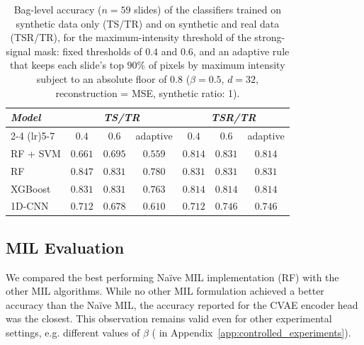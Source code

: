 \documentclass[12pt]{article}
\theoremstyle{paper}
\begin{document}
\begin{table}[H]
\centering
\small
\begin{tabular*}{\textwidth}{@{\extracolsep{\fill}}lcccccc}
\toprule
\multirow{2}{*}{\emph{Model}} & \multicolumn{3}{c}{\emph{TS/TR}} & \multicolumn{3}{c}{\emph{TSR/TR}} \\
\cmidrule(lr){2-4} \cmidrule(lr){5-7}
 & $0.4$ & $0.6$ & adaptive & $0.4$ & $0.6$ & adaptive \\
\midrule
RF + SVM & $0.661$ & $0.695$ & $0.559$ & $0.814$ & $0.831$ & $0.814$ \\
RF & $0.847$ & $0.831$ & $0.780$ & $0.831$ & $0.831$ & $0.831$ \\
XGBoost & $0.831$ & $0.831$ & $0.763$ & $0.814$ & $0.814$ & $0.814$ \\
1D-CNN & $0.712$ & $0.678$ & $0.610$ & $0.712$ & $0.746$ & $0.746$ \\
\bottomrule
\end{tabular*}
\caption{\small Bag-level accuracy ($n=59$ slides) of the classifiers trained on synthetic data only (TS/TR) and on synthetic and real data (TSR/TR), for the maximum-intensity threshold of the strong-signal mask: fixed thresholds of $0.4$ and $0.6$, and an adaptive rule that keeps each slide's top $90\%$ of pixels by maximum intensity subject to an absolute floor of $0.8$ ($\beta=0.5$, $d=32$, reconstruction = MSE, synthetic ratio: 1).}
\label{tab:threshold_results}
\end{table}


\subsection{MIL Evaluation}

We compared the best performing Naïve MIL implementation (RF) with the other MIL algorithms. While no other MIL formulation achieved a better accuracy than the Naïve MIL, the accuracy reported for the CVAE encoder head was the closest. This observation remains valid even for other experimental settings, e.g. different values of $\beta$ ( in Appendix~\ref{app:controlled_experiments}). 
\end{document}
